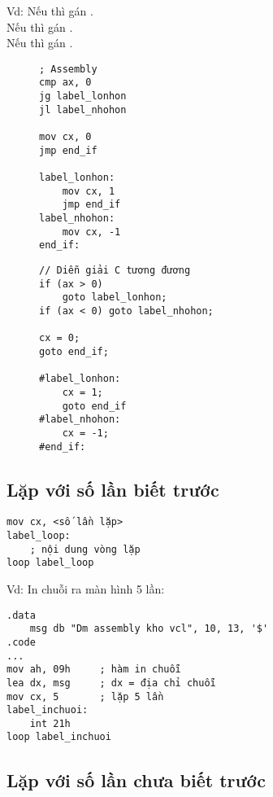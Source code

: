 \documentclass[main.tex]{subfiles}
\begin{document}
Vd: Nếu  thì gán .\\
Nếu  thì gán .\\
Nếu  thì gán .
\begin{figure}[H]
\begin{minipage}{0.5\textwidth}
\begin{verbatim}
; Assembly
cmp ax, 0 
jg label_lonhon
jl label_nhohon

mov cx, 0
jmp end_if 

label_lonhon:
    mov cx, 1
    jmp end_if
label_nhohon:
    mov cx, -1
end_if:
\end{verbatim}
\end{minipage}
\hfill
\begin{minipage}{0.4\textwidth}
\begin{verbatim}
// Diễn giải C tương đương 
if (ax > 0)
    goto label_lonhon;
if (ax < 0) goto label_nhohon;

cx = 0;
goto end_if;

#label_lonhon:
    cx = 1;
    goto end_if 
#label_nhohon:
    cx = -1;
#end_if:
\end{verbatim}
\end{minipage}
\end{figure}
\subsection{Lặp với số lần biết trước}
\begin{verbatim}
mov cx, <số lần lặp>
label_loop:
    ; nội dung vòng lặp 
loop label_loop
\end{verbatim}
Vd: In chuỗi  ra màn hình 5 lần:
\begin{verbatim}
.data
    msg db "Dm assembly kho vcl", 10, 13, '$'
.code 
... 
mov ah, 09h     ; hàm in chuỗi  
lea dx, msg     ; dx = địa chỉ chuỗi 
mov cx, 5       ; lặp 5 lần 
label_inchuoi:
    int 21h 
loop label_inchuoi
\end{verbatim}
\subsection{Lặp với số lần chưa biết trước }
\begin{figure}[H]
\centering
{}
\end{figure}
\end{document}
